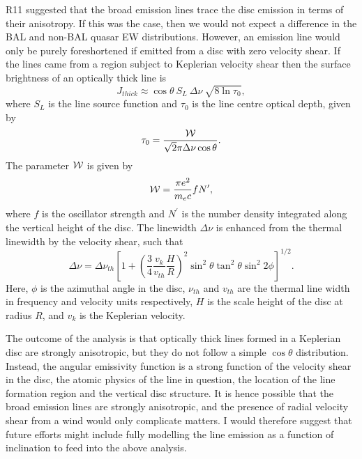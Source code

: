 R11 suggested that the broad emission lines trace the disc
emission in terms of their anisotropy. 
If this was the case, then we would not expect a difference in the BAL and non-BAL
quasar EW distributions. However, an emission line would only be purely 
foreshortened if emitted from a disc with zero velocity shear. 
If the lines came from a region subject to
Keplerian velocity shear then the surface brightness of an optically thick 
line is \citep{hornemarsh1986}
\begin{equation}
J_{thick} \approx \cos \theta~S_L~\Delta \nu~\sqrt{8 \ln \tau_0},
\end{equation}
where $S_L$ is the line source function and
$\tau_0$ is the line centre optical depth, given by
\begin{equation}
\tau_0 = \frac{{\cal W}}{\sqrt{2}\pi \Delta \nu \cos \theta}.
\end{equation}
The parameter ${{\cal W}}$ is given by
\begin{equation}
{{\cal W}} = \frac{\pi e^2}{m_e c}f N^\prime,
\end{equation}
where $f$ is the oscillator strength and $N^\prime$ is the number
density integrated along the vertical height of the disc. The linewidth
$\Delta \nu$ is enhanced from the thermal linewidth by the velocity shear, such
that
\begin{equation}
\Delta \nu = \Delta \nu_{th} \left[1 + 
\left(\frac{3}{4}\frac{v_{k}}{v_{th}}\frac{H}{R}\right)^2
\sin^2 \theta \tan^2 \theta \sin^2 2 \phi
\right]^{1/2}.
\end{equation}
Here, $\phi$ is the azimuthal angle in the disc, $\nu_{th}$ and $v_{th}$ are the 
thermal line width in frequency and velocity units respectively, 
$H$ is the scale height of the disc at radius $R$, and $v_k$ is the
Keplerian velocity.

The outcome of the \cite{hornemarsh1986} analysis is that optically thick lines 
formed in a Keplerian disc are strongly anisotropic, but they do not follow a simple 
$\cos \theta$ distribution. Instead, the angular emissivity function is
a strong function of the velocity shear in the disc, the atomic physics of
the line in question, the location of the line formation region 
and the vertical disc structure. It is hence possible
that the broad emission lines are strongly anisotropic, and the presence of radial
velocity shear from a wind would only complicate matters. 
I would therefore suggest that future efforts might include fully modelling 
the line emission as a function of inclination to feed into the above analysis.

